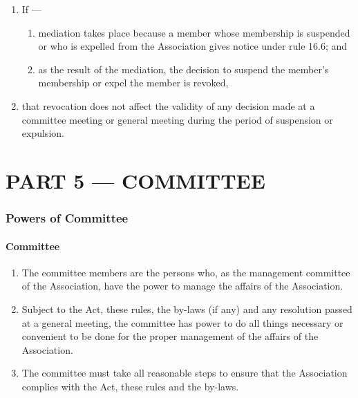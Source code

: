 \documentclass[../constitution.tex]{subfiles}
\begin{document}
\begin{enumerate}

\item If ---

  \begin{enumerate}
  
  \item mediation takes place because a member whose membership is suspended or who is expelled from the Association gives notice under rule 16.6; and
  \item as the result of the mediation, the decision to suspend the member's membership or expel the member is revoked,
  \end{enumerate}
\item that revocation does not affect the validity of any decision made at a committee meeting or general meeting during the period of suspension or expulsion.
\end{enumerate}

\hypertarget{part-5-committee}{%
\part{PART 5 --- COMMITTEE}\label{part-5-committee}}

\hypertarget{division-1-powers-of-committee}{%
\section{Powers of Committee}\label{division-1-powers-of-committee}}

\hypertarget{committee}{%
\subsection{Committee}\label{committee}}

\begin{enumerate}

\item The committee members are the persons who, as the management committee of the Association, have the power to manage the affairs of the Association.
\item Subject to the Act, these rules, the by-laws (if any) and any resolution passed at a general meeting, the committee has power to do all things necessary or convenient to be done for the proper management of the affairs of the Association.
\item The committee must take all reasonable steps to ensure that the Association complies with the Act, these rules and the by-laws.
\end{enumerate}
\end{document}
